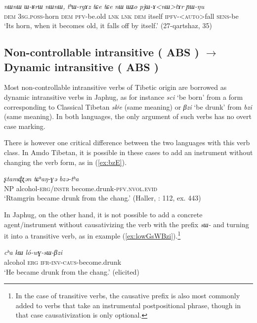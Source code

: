 \documentclass[oneside,a4paper,11pt]{article}
\makeatletter
\newcommand{\ipa}[1]{{\phon\textit{\mbox{#1}}}} %
\newcommand{\refb}[1]{(\ref{#1})}
\def\fakesc#1{%
  \begingroup%
  \xdef\fake@name{\csname\curr@fontshape/\f@size\endcsname}%
  \fontsize{\fontdimen8\fake@name}{\baselineskip}\selectfont%
  \uppercase{#1}%
  \endgroup%
}
\makeatother
\begin{document}
\begin{exe}
\ex \label{ex:thWrgAz}
\gll
\ipa{nɯnɯ}  	\ipa{ɯ-ʁrɯ}  	\ipa{nɯnɯ,}  	\ipa{tʰɯ-rgɤz}  	\ipa{tɕe}  	\ipa{tɕe}  	\ipa{nɯ}  	\ipa{ɯʑo}  	\ipa{pjɯ-ɤ<nɯ>tɤr}  	\ipa{ɲɯ-ŋu}  \\
\textsc{dem} \textsc{3sg.poss}-horn \textsc{dem} \textsc{pfv}-be.old \textsc{lnk}  \textsc{lnk} \textsc{dem} itself \textsc{ipfv}-<\textsc{auto}>fall \textsc{sens}-be \\
\glt `Its horn, when it becomes old, it falls off by itself.' (27-qartshaz, 35)
\end{exe}


\subsection{Non-controllable intransitive (\fakesc{abs}) $\rightarrow$ Dynamic intransitive (\fakesc{abs})}  
Most non-controllable intransitive verbs of Tibetic origin are borrowed as dynamic intransitive verbs in Japhug, as for instance \ipa{sci} `be born' from a form corresponding to Classical Tibetan \ipa{skʲe} (same meaning) or \ipa{βzi} `be drunk' from \ipa{bzi} (same meaning). In both languages, the only argument of such verbs has no overt case marking.

There is however one critical difference between the two languages with this verb class. In Amdo Tibetan, it is possible in these cases to add an instrument without changing the verb form, as in \refb{ex:bzE}.

\begin{exe}
\ex \label{ex:bzE}
\gll
\ipa{ʂtamɖʐən} 	\ipa{tɕʰaŋ-ɣə} \ipa{bzə-tʰa} 	 \\
NP alcohol-\textsc{erg/instr} become.drunk-\textsc{pfv.nvol.evid} \\
\glt `Rtamgrin became drunk from the chang.' (Haller, \citeyear{haller04themchen}: 112, ex. 443)
\end{exe}

In Japhug, on the other hand, it is not possible to add a concrete agent/instrument without causativizing the verb with the prefix \ipa{sɯ-} and turning it into a transitive verb, as in example \refb{ex:lowGsWBzi}.\footnote{In the case of transitive verbs, the causative prefix is also most commonly added to verbs that take an instrumental postpositional phrase, though in that case causativization is only optional.}

\begin{exe}
\ex \label{ex:lowGsWBzi}
\gll
\ipa{cʰa} 	\ipa{kɯ} 	\ipa{ló-wɣ-sɯ-βzi} \\ 
alcohol \textsc{erg} \textsc{ifr-inv-caus}-become.drunk \\
\glt `He became drunk from the chang.' (elicited)
\end{exe}
\end{document}
